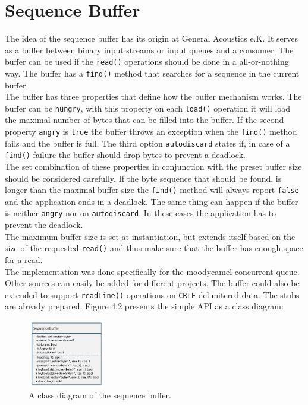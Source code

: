 \section{Sequence Buffer}
The idea of the sequence buffer has its origin at General Acoustics e.K. It serves as a buffer between binary input streams or input queues and a consumer. The buffer can be used if the \texttt{read()} operations should be done in a all-or-nothing way. The buffer has a \texttt{find()} method that searches for a sequence in the current buffer.\\
The buffer has three properties that define how the buffer mechanism works. The buffer can be \texttt{hungry}, with this property on each \texttt{load()} operation it will load the maximal number of bytes that can be filled into the buffer. If the second property \texttt{angry} is \texttt{true} the buffer throws an exception when the \texttt{find()} method fails and the buffer is full. The third option \texttt{autodiscard} states if, in case of a  \texttt{find()} failure the buffer should drop bytes to prevent a deadlock.\\
The set combination of these properties in conjunction with the preset buffer size should be considered carefully. If the byte sequence that should be found, is longer than the maximal buffer size the \texttt{find()} method will always report \texttt{false} and the application ends in a deadlock. The same thing can happen if the buffer is neither \texttt{angry} nor on \texttt{autodiscard}. In these cases the application has to prevent the deadlock.\\
The maximum buffer size is set at instantiation, but extends itself based on the size of the requested \texttt{read()} and thus make sure that the buffer has enough space for a read.\\
The implementation was done specifically for the moodycamel concurrent queue. Other sources can easily be added for different projects. The buffer could also be extended to support \texttt{readLine()} operations on \texttt{CRLF} delimitered data. The stubs are already prepared. Figure 4.2 presents the simple API as a class diagram:
\begin{figure}[ht]
\centering
      \includegraphics[width=0.3\textwidth]{seqbuf}
        \caption{A class diagram of the sequence buffer.}
\end{figure}

